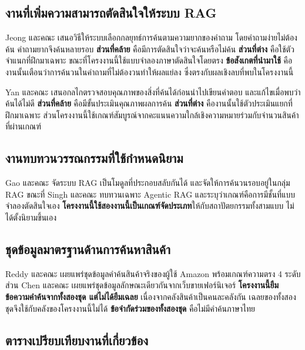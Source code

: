 \subsection{งานที่เพิ่มความสามารถตัดสินใจให้ระบบ RAG}

Jeong และคณะ \cite{jeong2024adaptive} เสนอวิธีให้ระบบเลือกกลยุทธ์การค้นตามความยากของคำถาม โดยคำถามง่ายไม่ต้องค้น คำถามยากจึงค้นหลายรอบ \textbf{ส่วนที่คล้าย} คือมีการตัดสินใจว่าจะค้นหรือไม่ค้น \textbf{ส่วนที่ต่าง} คือใช้ตัวจำแนกที่ฝึกมาเฉพาะ ขณะที่โครงงานนี้ใช้แบบจำลองภาษาตัดสินใจโดยตรง \textbf{ข้อสังเกตที่นำมาใช้} คืองานนั้นเตือนว่าการค้นวนในคำถามที่ไม่ต้องวนทำให้ผลแย่ลง ซึ่งตรงกับผลเชิงลบที่พบในโครงงานนี้

Yan และคณะ \cite{yan2024crag} เสนอกลไกตรวจสอบคุณภาพของสิ่งที่ค้นได้ก่อนนำไปเขียนคำตอบ และแก้ไขเมื่อพบว่าค้นได้ไม่ดี \textbf{ส่วนที่คล้าย} คือมีขั้นประเมินคุณภาพผลการค้น \textbf{ส่วนที่ต่าง} คืองานนั้นใช้ตัวประเมินแยกที่ฝึกมาเฉพาะ ส่วนโครงงานนี้ใช้เกณฑ์สัมบูรณ์จากคะแนนความใกล้เชิงความหมายร่วมกับจำนวนสินค้าที่ผ่านเกณฑ์

\subsection{งานทบทวนวรรณกรรมที่ใช้กำหนดนิยาม}

Gao และคณะ \cite{gao2024modular} จัดระบบ RAG เป็นโมดูลที่ประกอบสลับกันได้ และจัดให้การค้นวนรอบอยู่ในกลุ่ม RAG ขณะที่ Singh และคณะ \cite{singh2025agentic} ทบทวนเฉพาะ Agentic RAG และระบุว่าเกณฑ์คือการมีชั้นที่แบบจำลองตัดสินใจเอง \textbf{โครงงานนี้ใช้สองงานนี้เป็นเกณฑ์จัดประเภท}ให้กับสถาปัตยกรรมทั้งสามแบบ ไม่ได้ตั้งนิยามขึ้นเอง

\subsection{ชุดข้อมูลมาตรฐานด้านการค้นหาสินค้า}

Reddy และคณะ \cite{reddy2022esci} เผยแพร่ชุดข้อมูลคำค้นสินค้าจริงของผู้ใช้ Amazon พร้อมเกณฑ์ความตรง 4 ระดับ ส่วน Chen และคณะ \cite{chen2022wands} เผยแพร่ชุดข้อมูลลักษณะเดียวกันจากเว็บขายเฟอร์นิเจอร์ \textbf{โครงงานนี้ยืมข้อความคำค้นจากทั้งสองชุด แต่ไม่ได้ยืมเฉลย} เนื่องจากคลังสินค้าเป็นคนละคลังกัน เฉลยของทั้งสองชุดจึงใช้กับคลังของโครงงานนี้ไม่ได้ \textbf{ข้อจำกัดร่วมของทั้งสองชุด} คือไม่มีคำค้นภาษาไทย

\subsection{ตารางเปรียบเทียบงานที่เกี่ยวข้อง}

